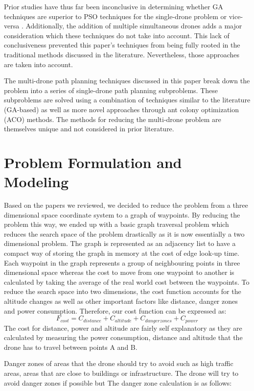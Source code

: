 \documentclass[conference]{IEEEtran}
\begin{document}
Prior studies have thus far been inconclusive in determining whether GA techniques are superior to PSO techniques for the single-drone problem \cite{b2} or vice-versa \cite{b3}. Additionally, the addition of multiple simultaneous drones adds a major consideration which these techniques do not take into account. This lack of conclusiveness prevented this paper's techniques from being fully rooted in the traditional methods discussed in the literature. Nevertheless, those approaches are taken into account.

The multi-drone path planning techniques discussed in this paper break down the problem into a series of single-drone path planning subproblems. These subproblems are solved using a combination of techniques similar to the literature (GA-based) as well as more novel approaches through ant colony optimization (ACO) methods. The methods for reducing the multi-drone problem are themselves unique and not considered in prior literature.

\section{Problem Formulation and Modeling}
Based on the papers we reviewed, we decided to reduce the problem from a three dimensional space coordinate system to a graph of waypoints. By reducing the problem this way, we ended up with a basic graph traversal problem which reduces the search space of the problem drastically as it is now essentially a two dimensional problem. The graph is represented as an adjacency list to have a compact way of storing the graph in memory at the cost of edge look-up time. Each waypoint in the graph represents a group of neighbouring points in three dimensional space whereas the cost to move from one waypoint to another is calculated by taking the average of the real world cost between the waypoints. To reduce the search space into two dimensions, the cost function accounts for the altitude changes as well as other important factors like distance, danger zones and power consumption. Therefore, our cost function can be expressed as:
$$F_{cost} = C_{distance} + C_{altitude} + C_{danger zones} + C_{power}$$
The cost for distance, power and altitude are fairly self explanatory as they are calculated by measuring the power consumption, distance and altitude that the drone has to travel between points A and B.

Danger zones of areas that the drone should try to avoid such as high traffic areas, areas that are close to buildings or infrastructure. The drone will try to avoid danger zones if possible but  The danger zone calculation is as follows: 
\end{document}
